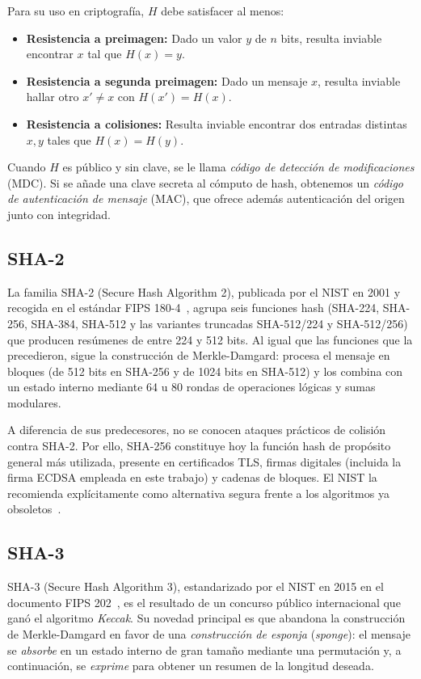 Para su uso en criptografía, \(H\) debe satisfacer al menos:

\begin{itemize}
  \item \textbf{Resistencia a preimagen:} Dado un valor \(y\) de \(n\) bits, resulta inviable encontrar \(x\) tal que \(H(x)=y\).
  \item \textbf{Resistencia a segunda preimagen:} Dado un mensaje \(x\), resulta inviable hallar otro \(x'\neq x\) con \(H(x')=H(x)\).
  \item \textbf{Resistencia a colisiones:} Resulta inviable encontrar dos entradas distintas \(x,y\) tales que \(H(x)=H(y)\).
\end{itemize}

Cuando \(H\) es público y sin clave, se le llama \emph{código de detección de modificaciones} (MDC). Si se añade una clave secreta al cómputo de hash, obtenemos un \emph{código de autenticación de mensaje} (MAC), que ofrece además autenticación del origen junto con integridad.

\subsection{SHA-2}
La familia SHA-2 (Secure Hash Algorithm 2), publicada por el NIST en 2001 y recogida en el estándar FIPS 180-4~\citep{nist-fips180-4}, agrupa seis funciones hash (SHA-224, SHA-256, SHA-384, SHA-512 y las variantes truncadas SHA-512/224 y SHA-512/256) que producen resúmenes de entre 224 y 512 bits. Al igual que las funciones que la precedieron, sigue la construcción de Merkle-Damgard: procesa el mensaje en bloques (de 512 bits en SHA-256 y de 1024 bits en SHA-512) y los combina con un estado interno mediante 64 u 80 rondas de operaciones lógicas y sumas modulares.

A diferencia de sus predecesores, no se conocen ataques prácticos de colisión contra SHA-2. Por ello, SHA-256 constituye hoy la función hash de propósito general más utilizada, presente en certificados TLS, firmas digitales (incluida la firma ECDSA empleada en este trabajo) y cadenas de bloques. El NIST la recomienda explícitamente como alternativa segura frente a los algoritmos ya obsoletos~\citep{nist-sp800-131a}.

\subsection{SHA-3}
SHA-3 (Secure Hash Algorithm 3), estandarizado por el NIST en 2015 en el documento FIPS 202~\citep{nist-fips202}, es el resultado de un concurso público internacional que ganó el algoritmo \emph{Keccak}. Su novedad principal es que abandona la construcción de Merkle-Damgard en favor de una \emph{construcción de esponja} (\emph{sponge}): el mensaje se \emph{absorbe} en un estado interno de gran tamaño mediante una permutación y, a continuación, se \emph{exprime} para obtener un resumen de la longitud deseada.

